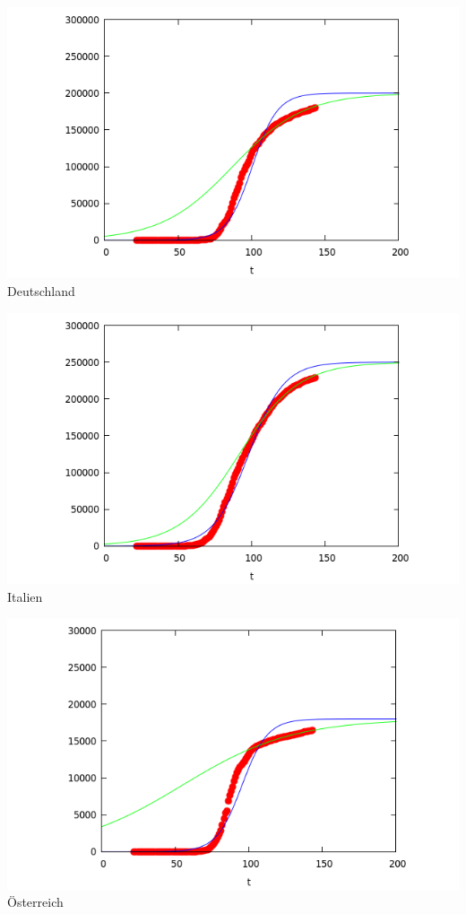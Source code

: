 \documentclass[a4paper,11pt]{article}
\begin{document}
\begin{center}
  \begin{minipage}{.3\textwidth}\centering
    \includegraphics[width=\textwidth]{Germany-3.png}\\[1em] {Deutschland}
  \end{minipage}\hfill
  \begin{minipage}{.3\textwidth}\centering
    \includegraphics[width=\textwidth]{Italy-3.png}\\[1em] {Italien}
  \end{minipage}\hfill
  \begin{minipage}{.3\textwidth}\centering
    \includegraphics[width=\textwidth]{Austria-3.png}\\[1em] {Österreich}
  \end{minipage}
\end{center}
\end{document}
